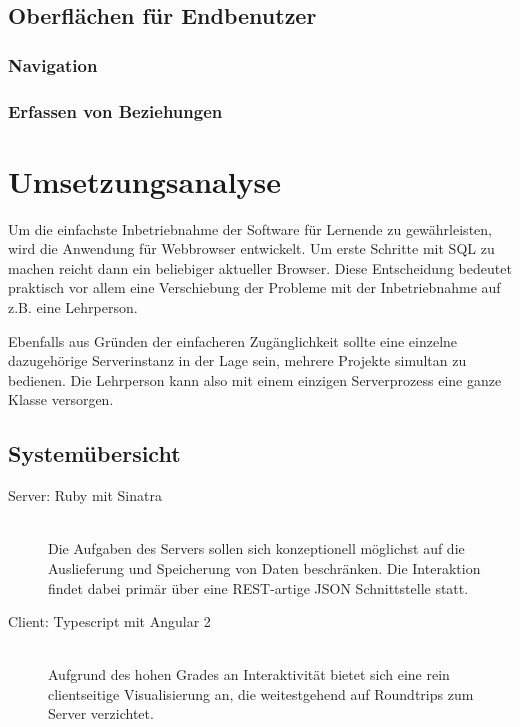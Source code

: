 \documentclass[paper=a4,fontsize=11pt,parskip=half]{scrartcl}
\begin{document}
\subsection{Oberflächen für Endbenutzer}


\subsubsection{Navigation}

\subsubsection{Erfassen von Beziehungen}




\section{Umsetzungsanalyse}
\label{sec:implementation-analysis}


Um die einfachste Inbetriebnahme der Software für Lernende zu gewährleisten, wird die Anwendung für Webbrowser entwickelt. Um erste Schritte mit SQL zu machen reicht dann ein beliebiger aktueller Browser. Diese Entscheidung bedeutet praktisch vor allem eine Verschiebung der Probleme mit der Inbetriebnahme auf z.B. eine Lehrperson.

Ebenfalls aus Gründen der einfacheren Zugänglichkeit sollte eine einzelne dazugehörige Serverinstanz in der Lage sein, mehrere Projekte simultan zu bedienen. Die Lehrperson kann also mit einem einzigen Serverprozess eine ganze Klasse versorgen.

\subsection{Systemübersicht}

\begin{description}
\item[Server: Ruby mit Sinatra] \hfill\\
  Die Aufgaben des Servers sollen sich konzeptionell möglichst auf die Auslieferung und Speicherung von Daten beschränken. Die Interaktion findet dabei primär über eine REST-artige JSON Schnittstelle statt.
\item[Client: Typescript mit Angular 2] \hfill\\
  Aufgrund des hohen Grades an Interaktivität bietet sich eine rein clientseitige Visualisierung an, die weitestgehend auf Roundtrips zum Server verzichtet.
\end{description}
\end{document}
